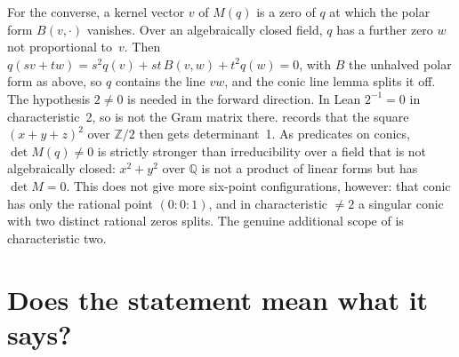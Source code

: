 \documentclass[11pt]{article}
\theoremstyle{definition}
\theoremstyle{remark}
\begin{document}
For the converse, a kernel vector $v$ of $M(q)$ is a zero of $q$ at which the polar form
$B(v,\cdot)$ vanishes. Over an algebraically closed field, $q$ has a further zero $w$ not
proportional to~$v$. Then $q(sv+tw)=s^2q(v)+st\,B(v,w)+t^2q(w)=0$, with $B$ the unhalved polar form as above, so $q$ contains the line $vw$,
and the conic line lemma splits it off. The hypothesis $2\ne0$ is needed in the forward
direction. In Lean $2^{-1}=0$ in characteristic~2, so  is not the Gram matrix there.
 records that the square $(x+y+z)^2$ over $\mathbb{Z}/2$ then gets
determinant~1. As predicates on conics, $\det M(q)\ne0$ is strictly stronger than irreducibility over a field
that is not algebraically closed: $x^2+y^2$ over $\mathbb{Q}$ is not a product of linear forms but
has $\det M=0$. This does not give more six-point configurations, however: that conic has only the
rational point $(0:0:1)$, and in characteristic $\ne2$ a singular conic with two distinct rational
zeros splits. The genuine additional scope of  is characteristic two.

\section{Does the statement mean what it says?}\label{sec:correct}
\end{document}
